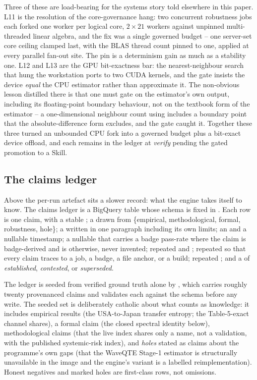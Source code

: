 Three of these are load-bearing for the systems story told elsewhere in this
paper. L11 is the resolution of the core-governance hang: two concurrent
robustness jobs each forked one worker per logical core, $2 \times 21$ workers
against unpinned multi-threaded linear algebra, and the fix was a single governed
budget -- one server-set core ceiling clamped last, with the BLAS thread count
pinned to one, applied at every parallel fan-out site. The pin is a determinism
gain as much as a stability one. L12 and L13 are the GPU bit-exactness bar: the
nearest-neighbour search that hung the workstation ports to two CUDA kernels, and
the gate insists the device \emph{equal} the CPU estimator rather than approximate
it. The non-obvious lesson distilled there is that one must gate on the
estimator's own output, including its floating-point boundary behaviour, not on
the textbook form of the estimator -- a one-dimensional neighbour count using
 includes a boundary point that the absolute-difference form
excludes, and the gate caught it. Together these three turned an unbounded CPU
fork into a governed budget plus a bit-exact device offload, and each remains in
the ledger at \emph{verify} pending the gated promotion to a Skill.

\subsection{The claims ledger}
\label{sec:verification-claims}

Above the per-run artefact sits a slower record: what the engine takes itself to
know. The claims ledger is a BigQuery table whose schema is fixed in
. Each row is one claim, with a stable
; a  drawn from \{empirical, methodological, formal,
robustness, hole\}; a  written in one paragraph including its own
limits; an  and a nullable  timestamp;
a nullable  that carries a badge pass-rate where the claim is
badge-derived and is  otherwise, never invented; repeated
 and ; repeated 
so that every claim traces to a job, a badge, a file anchor, or a build; repeated
; and a  of \emph{established}, \emph{contested}, or
\emph{superseded}.

The ledger is seeded from verified ground truth alone by
, which carries roughly twenty provenanced claims
and validates each against the schema before any write. The seeded set is
deliberately catholic about what counts as knowledge: it includes empirical
results (the USA-to-Japan transfer entropy; the Table-5-exact channel shares), a
formal claim (the closed spectral identity below), methodological claims (that the
live index shares only a name, not a validation, with the published systemic-risk
index), and \emph{holes} stated as claims about the programme's own gaps (that the
WaveQTE Stage-1 estimator is structurally unavailable in the image and the
engine's variant is a labelled reimplementation). Honest negatives and marked
holes are first-class rows, not omissions.

